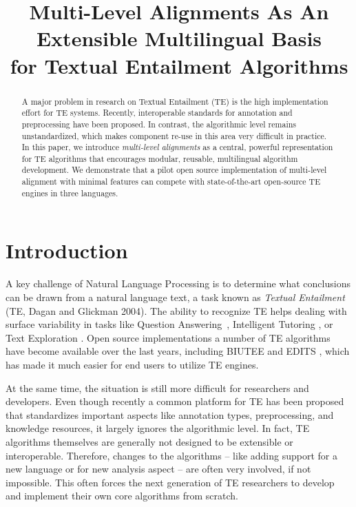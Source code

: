 \documentclass[11pt,letterpaper]{article}
\title{Multi-Level Alignments As An Extensible Multilingual Basis \\ for
  Textual Entailment Algorithms}
\date{}
\begin{document}
\maketitle
\begin{abstract}
  A major problem in research on Textual Entailment (TE) is the high
  implementation effort for TE systems. Recently, interoperable
  standards for annotation and preprocessing have been proposed. In
  contrast, the algorithmic level remains unstandardized, which
  makes component re-use in this area very difficult in
  practice.
%
%
%
  In this paper, we introduce {\em multi-level alignments} as a
  central, powerful representation for TE algorithms that encourages
  modular, reusable, multilingual algorithm development.
  We demonstrate that a pilot open source implementation of
  multi-level alignment with minimal features can compete with
  state-of-the-art open-source TE engines in three languages.
\end{abstract}

\section{Introduction}
A key challenge of Natural Language Processing is to determine what
conclusions can be drawn from a natural language text, a task known as
\textit{Textual Entailment} (TE, Dagan and Glickman
2004).\nocite{dagan04:_probab_textual_entail} The ability to recognize
TE helps dealing with surface variability in tasks like Question
Answering~\cite{harabagiu-hickl:2006:COLACL}, Intelligent Tutoring
\cite{nielsen09:_recog_entail_in_intel_tutor_system}, or Text
Exploration \cite{berant2012learning}. Open source implementations a
number of TE algorithms have become available over the last years,
including BIUTEE \cite{Stern:2012} and EDITS \cite{Kouylekov:2010},
which has made it much easier for end users to utilize TE engines.

At the same time, the situation is still more difficult for
researchers and developers. Even though recently a common platform for
TE has been proposed \cite{EOP-arch} that standardizes important
aspects like annotation types, preprocessing, and knowledge resources,
it largely ignores the algorithmic level. In fact, TE algorithms
themselves are generally not designed to be extensible or
interoperable. Therefore, changes to the algorithms -- like adding
support for a new language or for new analysis aspect -- are often
very involved, if not impossible. This often forces the next
generation of TE researchers to develop and implement their own core
algorithms from scratch.
\end{document}
